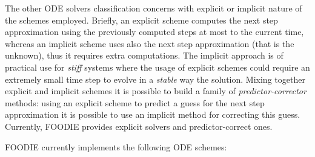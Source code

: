 The other ODE solvers classification concerns with explicit or implicit nature of the schemes employed. Briefly, an explicit scheme computes the next step approximation using the previously computed steps at most to the current time, whereas an implicit scheme uses also the next step approximation (that is the unknown), thus it requires extra computations. The implicit approach is of practical use for \emph{stiff} systems where the usage of explicit schemes could require an extremely small time step to evolve in a \emph{stable} way the solution. Mixing together explicit and implicit schemes it is possible to build a family of \emph{predictor-corrector} methods: using an explicit scheme to predict a guess for the next step approximation it is possible to use an implicit method for correcting this guess. Currently, FOODIE provides explicit solvers and predictor-correct ones.

FOODIE currently implements the following ODE schemes:

